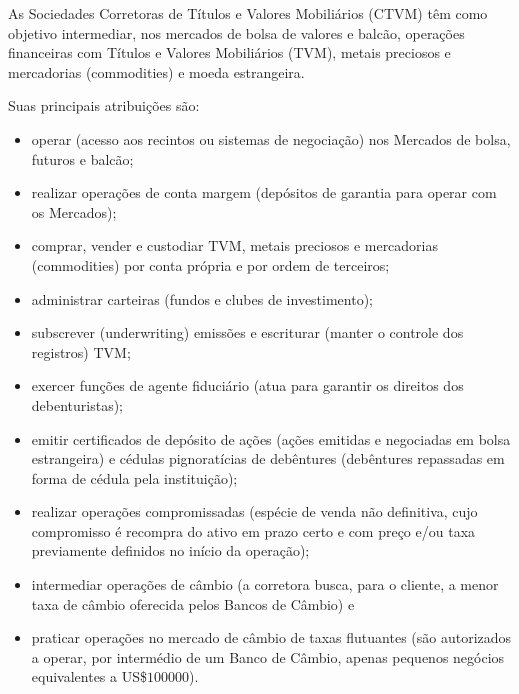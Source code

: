 \documentclass{article}\usepackage[]{graphicx}\usepackage[]{xcolor}
\begin{document}
As Sociedades Corretoras de Títulos e Valores Mobiliários (CTVM) têm como objetivo intermediar,
nos mercados de bolsa de valores e balcão, operações financeiras com Títulos e Valores Mobiliários (TVM),
metais preciosos e mercadorias (commodities) e moeda estrangeira.\par

Suas principais atribuições são:

\begin{itemize}

  \item operar (acesso aos recintos ou sistemas de negociação) nos Mercados de bolsa, futuros e balcão;

  \item realizar operações de conta margem (depósitos de garantia para operar com os Mercados);

  \item comprar, vender e custodiar TVM, metais preciosos e mercadorias (commodities) por conta própria e por ordem de terceiros;

  \item administrar carteiras (fundos e clubes de investimento);

  \item subscrever (underwriting) emissões e escriturar (manter o controle dos registros) TVM;

  \item exercer funções de agente fiduciário (atua para garantir os direitos dos debenturistas);

  \item emitir certificados de depósito de ações (ações emitidas e negociadas em bolsa estrangeira) e cédulas
  pignoratícias de debêntures (debêntures repassadas em forma de cédula pela instituição);

  \item realizar operações compromissadas (espécie de venda não definitiva, cujo compromisso é recompra do
  ativo em prazo certo e com preço e/ou taxa previamente definidos no início da operação);

  \item intermediar operações de câmbio (a corretora busca, para o cliente, a menor taxa de câmbio
  oferecida pelos Bancos de Câmbio) e

  \item praticar operações no mercado de câmbio de taxas flutuantes (são autorizados a operar, por intermédio
  de um Banco de Câmbio, apenas pequenos negócios equivalentes a US\$$\num{100000}$).

\end{itemize}
\end{document}
